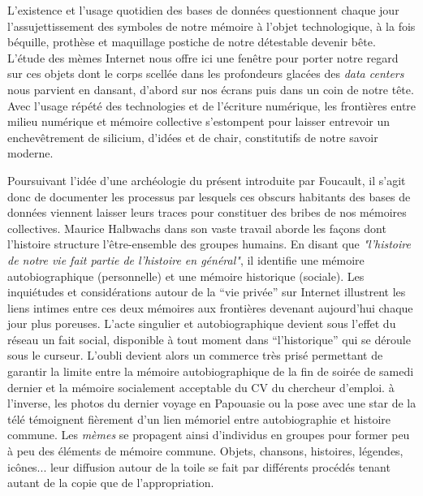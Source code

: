 L{\textquoteright}existence et l{\textquoteright}usage quotidien des bases de données questionnent chaque jour l{\textquoteright}assujettissement des symboles de notre mémoire à l{\textquoteright}objet technologique, à la fois béquille, prothèse et maquillage postiche de notre détestable devenir bête. L{\textquoteright}étude des mèmes Internet nous offre ici une fenêtre pour porter notre regard sur ces objets dont le corps scellée dans les profondeurs glacées des \textit{data centers }nous parvient en dansant, d{\textquoteright}abord sur nos écrans puis dans un coin de notre tête. Avec l{\textquoteright}usage répété des technologies et de l{\textquoteright}écriture numérique, les frontières entre milieu numérique et mémoire collective s{\textquoteright}estompent pour laisser entrevoir un enchevêtrement de silicium, d{\textquoteright}idées et de chair, constitutifs de notre savoir moderne. 

Poursuivant l{\textquoteright}idée d{\textquoteright}une archéologie du présent introduite par Foucault, il s{\textquoteright}agit donc de documenter les processus par lesquels ces obscurs habitants des bases de données viennent laisser leurs traces pour constituer des bribes de nos mémoires collectives. Maurice Halbwachs dans son vaste travail aborde les fa\c{c}ons dont l{\textquoteright}histoire structure l{\textquoteright}être-ensemble des groupes humains. En disant que \textit{"l'histoire de notre vie fait partie de l'histoire en général"}\citep{Halbwachs1947}, il identifie une mémoire autobiographique (personnelle) et une mémoire historique (sociale). Les inquiétudes et considérations autour de la {\textquotedblleft}vie privée{\textquotedblright} sur Internet illustrent les liens intimes entre ces deux mémoires aux frontières devenant aujourd{\textquoteright}hui chaque jour plus poreuses. L{\textquoteright}acte singulier et autobiographique devient sous l{\textquoteright}effet du réseau un fait social, disponible à tout moment dans {\textquotedblleft}l{\textquoteright}historique{\textquotedblright} qui se déroule sous le curseur. L{\textquoteright}oubli devient alors un commerce très prisé permettant de garantir la limite entre la mémoire autobiographique de la fin de soirée de samedi dernier et la mémoire socialement acceptable du CV du chercheur d{\textquoteright}emploi. à l{\textquoteright}inverse, les photos du dernier voyage en Papouasie ou la pose avec une star de la télé témoignent fièrement d{\textquoteright}un lien mémoriel entre autobiographie et histoire commune. Les \textit{mèmes} se propagent ainsi d{\textquoteright}individus en groupes pour former peu à peu des éléments de mémoire commune. Objets, chansons, histoires, légendes, icônes... leur diffusion autour de la toile se fait par différents procédés tenant autant de la copie que de l{\textquoteright}appropriation. 

